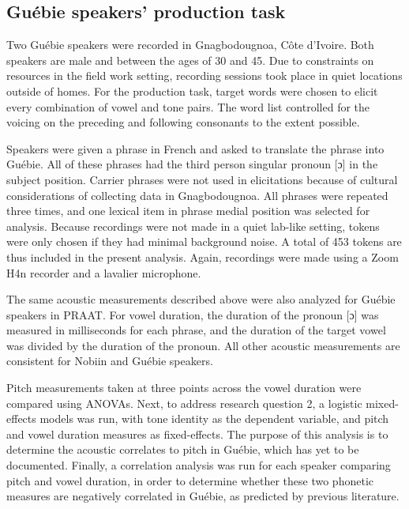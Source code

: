 \documentclass[output=paper]{langscibook}
\begin{document}
\subsection{Guébie speakers' production task}
\begin{sloppypar}
Two Guébie speakers were recorded in Gnagbodougnoa, C\^ote d'Ivoire. Both speakers are male and between the ages of 30 and 45. Due to constraints on resources in the field work setting, recording sessions took place in quiet locations outside of homes. For the production task, target words were chosen to elicit every combination of vowel and tone pairs. The word list controlled for the voicing on the preceding and following consonants to the extent possible. 
\end{sloppypar}

Speakers were given a phrase in French and asked to translate the phrase into Guébie. All of these phrases had the third person singular pronoun [ɔ] in the subject position. Carrier phrases were not used in elicitations because of cultural considerations of collecting data in Gnagbodougnoa. All phrases were repeated three times, and one lexical item in phrase medial position was selected for analysis. Because recordings were not made in a quiet lab-like setting, tokens were only chosen if they had minimal background noise. A total of 453 tokens are thus included in the present analysis. Again, recordings were made using a Zoom H4n recorder and a lavalier microphone. 

The same acoustic measurements described above were also analyzed for Guébie speakers in PRAAT. For vowel duration, the duration of the pronoun [ɔ] was measured in milliseconds for each phrase, and the duration of the target vowel was divided by the duration of the pronoun. All other acoustic measurements are consistent for Nobiin and Guébie speakers.

Pitch measurements taken at three points across the vowel duration were compared using ANOVAs. Next, to address research question 2, a logistic mixed-effects models was run, with tone identity as the dependent variable, and pitch and vowel duration measures as fixed-effects. The purpose of this analysis is to determine the acoustic correlates to pitch in Guébie, which has yet to be documented. Finally, a correlation analysis was run for each speaker comparing pitch and vowel duration, in order to determine whether these two phonetic measures are negatively correlated in Guébie, as predicted by previous literature.
\end{document}
